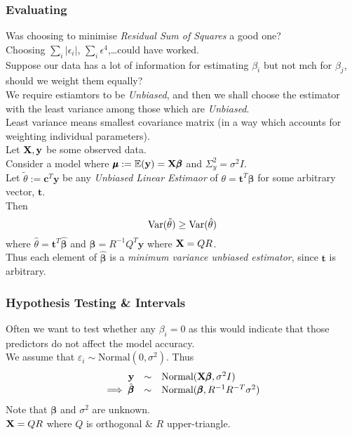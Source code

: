 \documentclass[11pt,a4paper]{article}
\begin{document}
\subsubsection{Evaluating}

Was choosing to minimise \textit{Residual Sum of Squares} a good one?\\
\nb Choosing $\sum_i|\epsilon_i|$, $\sum_i\epsilon^4$,\dots could have worked.\\

Suppose our data has a lot of information for estimating $\beta_i$ but not mch for $\beta_j$, should we weight them equally?\\

We require estiamtors to be \textit{Unbiased}, and then we shall choose the estimator with the least variance among those which are \textit{Unbiased}.\\
\nb Least variance means smallest covariance matrix (in a way which accounts for weighting individual parameters).\\

Let $\textbf{X},\textbf{y}$ be some observed data.\\
Consider a model where $\pmb\mu:=\mathbb{E}(\textbf{y})=\textbf{X}\pmb\beta$ and $\Sigma^2_y=\sigma^2I$.\\
Let $\tilde\theta:=\textbf{c}^T\textbf{y}$ be any \textit{Unbiased Linear Estimaor} of $\theta=\textbf{t}^T\pmb\beta$ for some arbitrary vector, $\textbf{t}$.\\
Then
$$\mathrm{Var}(\tilde\theta)\geq\mathrm{Var}(\hat\theta)$$
where $\hat\theta=\textbf{t}^T\hat{\pmb\beta}$ and $\hat{\pmb\beta}=R^{-1}Q^T\textbf{y}$ where $\textbf{X}=QR$.\\
Thus each element of $\hat{\pmb\beta}$ is a \textit{minimum variance unbiased estimator}, since $\textbf{t}$ is arbitrary.

\subsubsection{Hypothesis Testing \& Intervals}

Often we want to test whether any $\beta_i=0$ as this would indicate that those predictors do not affect the model accuracy.\\

We assume that $\varepsilon_i\sim\text{Normal}(0,\sigma^2)$. Thus
\[\begin{array}{rcl}
\textbf{y}&\sim&\text{Normal}(\textbf{X}\pmb\beta,\sigma^2I)\\
\implies\hat{\pmb\beta}&\sim&\text{Normal}(\pmb\beta,R^{-1}R^{-T}\sigma^2)
\end{array}\]
Note that $\pmb\beta$ and $\sigma^2$ are unknown.\\
\nb $\textbf{X}=QR$ where $Q$ is orthogonal \& $R$ upper-triangle.
\end{document}

